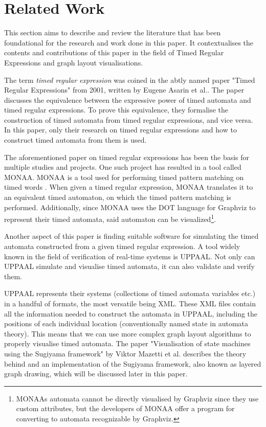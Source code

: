 \section{Related Work}



This section aims to describe and review the literature that has been foundational for the research and work done in this paper. It contextualises the contents and contributions of this paper in the field of Timed Regular Expressions and graph layout visualisations.

The term \textit{timed regular expression} was coined in the abtly named paper "Timed Regular Expressions" from 2001, written by Eugene Asarin et al.\cite{Eugene2001}. The paper discusses the equivalence between the expressive power of timed automata\cite{ALUR1994} and timed regular expressions. To prove this equivalence, they formalise the construction of timed automata from timed regular expressions, and vice versa. In this paper, only their research on timed regular expressions and how to construct timed automata from them is used.

The aforementioned paper on timed regular expressions has been the basis for multiple studies and projects. One such project has resulted in a tool called MONAA. MONAA is a tool used for performing timed pattern matching on timed words \cite{MONAA2017}. When given a timed regular expression, MONAA translates it to an equivalent timed automaton, on which the timed pattern matching is performed. Additionally, since MONAA uses the DOT language for Graphviz \cite{Graphviz} to represent their timed automata, said automaton can be visualized\footnote{MONAAs automata cannot be directly visualised by Graphviz since they use custom attributes, but the developers of MONAA offer a program for converting to automata recognizable by Graphviz\cite{MONAA2017}.}.

Another aspect of this paper is finding suitable software for simulating the timed automata constructed from a given timed regular expression. A tool widely known in the field of verification of real-time systems is UPPAAL. Not only can UPPAAL simulate and visualise timed automata, it can also validate and verify them\cite{UPPAAL}.

UPPAAL represents their systems (collections of timed automata variables etc.) in a handful of formats, the most versatile being XML\cite{UPPAAL}. These XML files contain all the information needed to construct the automata in UPPAAL, including the positions of each individual location (conventionally named state in automata theory). This means that we can use more complex graph layout algorithms to properly visualise timed automata. The paper "Visualisation of state machines using the Sugiyama framework" by Viktor Mazetti et al. describes the theory behind and an implementation of the Sugiyama framework, also known as layered graph drawing, which will be discussed later in this paper.